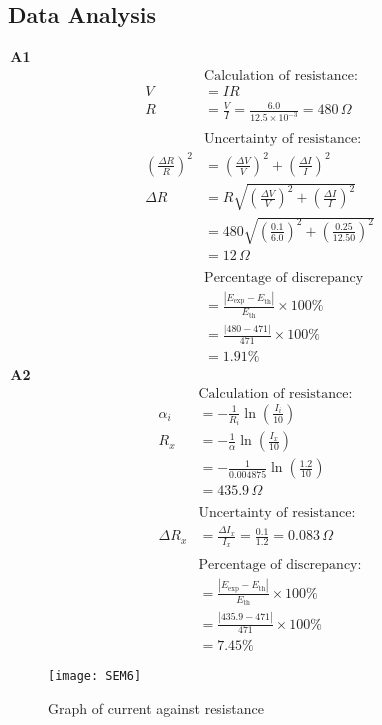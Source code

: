 \documentclass[twocolumn,a4paper,11pt]{article}
\begin{document}
\subsection*{Data Analysis}
{\,\textbf{A1} \,} 
\begin{align*}
&\text{Calculation of resistance:}\\
V &= IR \\
R &= \frac{V}{I} = \frac{6.0}{12.5 \times 10^{-3}} = 480 \,\Omega\\
\\
&\text{Uncertainty of resistance:}\\
(\frac{\Delta R}{R})^2 &= (\frac{\Delta V}{V})^2 +(\frac{\Delta I}{I})^2\\
\Delta R &= R \sqrt{(\frac{\Delta V}{V})^2 +(\frac{\Delta I}{I})^2}\\
&= 480 \sqrt{(\frac{0.1}{6.0})^2 +(\frac{0.25}{12.50})^2}\\
&= 12\,\Omega\\
\\
&\text{Percentage of discrepancy}\\
&= \frac{|E_{\text{exp}} - E_{\text{th}}|}{E_{\text{th}}} \times 100\% \\
&= \frac{|480 - 471|}{471} \times 100\%\\
&= 1.91 \%
\end{align*}
{\,\textbf{A2} \,}
\begin{align*}
&\text{Calculation of resistance:}\\
\alpha_i &= -\frac{1}{R_i} \ln (\frac{I_i}{10})\\
R_x &= -\frac{1}{\alpha} \ln (\frac{I_x}{10})\\
&= -\frac{1}{0.004875} \ln (\frac{1.2}{10})\\
&=435.9\,\Omega\\
\\
&\text{Uncertainty of resistance:}\\
\Delta R_x &=\frac{\Delta I_x}{I_x}= \frac{0.1}{1.2}= 0.083\,\Omega\\
\\
&\text{Percentage of discrepancy:}\\
&= \frac{|E_{\text{exp}} - E_{\text{th}}|}{E_{\text{th}}} \times 100\% \\
&= \frac{|435.9 - 471|}{471} \times 100\%\\
&= 7.45 \%
\end{align*}
\newpage
\begin{figure}[htbp]
\texttt{[image: SEM6]}
\caption{Graph of current against resistance }
\label{6}
\end{figure}
\end{document}
